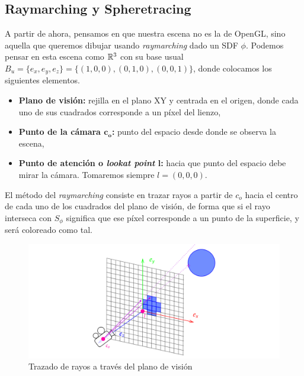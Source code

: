 \subsection{Raymarching y Spheretracing}
A partir de ahora, pensamos en que nuestra escena no es la de OpenGL, sino aquella que queremos dibujar usando \textit{raymarching} dado un SDF $\phi$. Podemos pensar en esta escena como $\mathbb{R}^3$ con su base usual $B_u = \{e_x,e_y,e_z\} = \{(1,0,0),(0,1,0),(0,0,1)\}$, donde colocamos los siguientes elementos.
\begin{itemize}
    \item \textbf{Plano de visión:} rejilla en el plano XY y centrada en el origen, donde cada uno de sus cuadrados corresponde a un píxel del lienzo,
    \item \textbf{Punto de la cámara $\boldsymbol{c_o}$:} punto del espacio desde donde se observa la escena,
    \item \textbf{Punto de atención o \textit{lookat point} $\boldsymbol{l}$:} hacia que punto del espacio debe mirar la cámara. Tomaremos siempre $l=(0,0,0)$.
\end{itemize}

El método del \textit{raymarching} consiste en trazar rayos a partir de $c_o$ hacia el centro de cada uno de los cuadrados del plano de visión, de forma que si el rayo interseca con $S_\phi$ significa que ese píxel corresponde a un punto de la superficie, y será coloreado como tal.
\begin{figure}[h]
    \centering
    \includegraphics[width=\textwidth]{Plantilla-TFG-master/img/raymarch.png}
    \caption{Trazado de rayos a través del plano de visión}
    \label{fig:raymarch1}
\end{figure}
\newline

